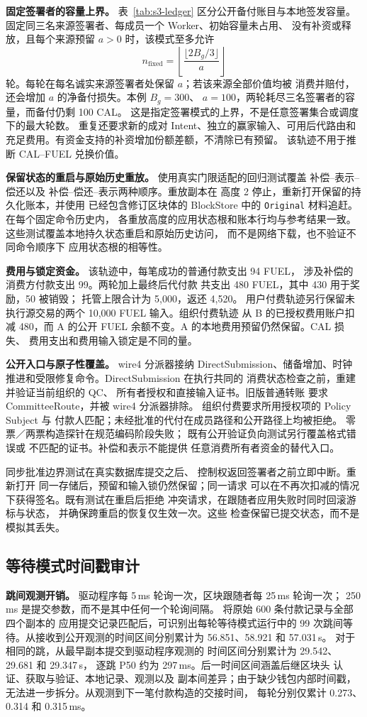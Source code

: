 \noindent\textbf{固定签署者的容量上界。}
表~\ref{tab:s3-ledger} 区分公开备付账目与本地签发容量。
固定同三名来源签署者、每成员一个 Worker、初始容量未占用、
没有补资或释放，且每个来源预留 $a>0$ 时，该模式至多允许
\[
  n_{\mathrm{fixed}}=\left\lfloor
       \frac{\lfloor2B_g/3\rfloor}{a}\right\rfloor
\]
轮。每轮在每名诚实来源签署者处保留 $a$；若该来源全部价值均被
消费并赔付，还会增加 $a$ 的净备付损失。本例 $B_g=300$、
$a=100$，两轮耗尽三名签署者的容量，而备付仍剩 100 CAL。
这是指定签署模式的上界，不是任意签署集合或调度下的最大轮数。
重复还要求新的成对 Intent、独立的赢家输入、可用后代路由和
充足费用。有资金支持的补资增加份额差额，不清除已有预留。
该轨迹不用于推断 CAL--FUEL 兑换价值。

\noindent\textbf{保留状态的重启与原始历史重放。}
使用真实门限适配的回归测试覆盖
补偿--表示--偿还以及
补偿--偿还--表示两种顺序。重放副本在
高度 2 停止，重新打开保留的持久化账本，并使用
已经包含修订区块体的 BlockStore 中的
\texttt{Original} 材料追赶。在每个固定命令历史内，
各重放高度的应用状态根和账本行均与参考结果一致。
这些测试覆盖本地持久状态重启和原始历史访问，
而不是网络下载，也不验证不同命令顺序下
应用状态根的相等性。

\noindent\textbf{费用与锁定资金。}
该轨迹中，每笔成功的普通付款支出 94 FUEL，
涉及补偿的消费方付款支出 99。两轮加上最终后代付款
共支出 480 FUEL，其中 430 用于奖励，50 被销毁；
托管上限合计为 5,000，返还 4,520。
用户付费轨迹另行保留未执行源交易的两个
10,000 FUEL 输入。组织付费轨迹
从 B 的已授权费用账户扣减 480，而 A 的公开 FUEL
余额不变。A 的本地费用预留仍然保留。CAL 损失、
费用支出和费用输入锁定是不同的量。

\noindent\textbf{公开入口与原子性覆盖。}
wire4 分派器接纳 DirectSubmission、储备增加、时钟
推进和受限修复命令。DirectSubmission 在执行共同的
消费状态检查之前，重建并验证当前组织的 QC、
所有者授权和直接输入证书。旧版普通转账
要求 CommitteeRoute，并被 wire4 分派器排除。
组织付费要求所用授权项的 Policy Subject 与
付款人匹配；未经批准的代付在成员路径和公开路径上均被拒绝。
零票／两票构造探针在规范编码阶段失败；
既有公开验证负向测试另行覆盖格式错误或
不匹配的证书。补偿和表示不能提供
任意消费所有者资金的替代入口。

同步批准边界测试在真实数据库提交之后、
控制权返回签署者之前立即中断。重新打开
同一存储后，预留和输入锁仍然保留；同一请求
可以在不再次扣减的情况下获得签名。既有测试在重启后拒绝
冲突请求，在跟随者应用失败时同时回滚游标与状态，
并确保跨重启的恢复仅生效一次。这些
检查保留已提交状态，而不是模拟其丢失。

\subsection{等待模式时间戳审计}
\noindent\textbf{跳间观测开销。}
驱动程序每 5\,ms 轮询一次，区块跟随者每 25\,ms 轮询一次；
250\,ms 是提交参数，而不是其中任何一个轮询间隔。
将原始 600 条付款记录与全部四个副本的
应用提交记录匹配后，可识别出每轮等待模式运行中的
99 次跳间等待。从接收到公开观测的时间区间分别累计为
56.851、58.921 和 57.031\,s。
对于相同的跳，从最早副本提交到驱动程序观测的
时间区间分别累计为 29.542、29.681 和 29.347\,s，
逐跳 P50 约为 297\,ms。后一时间区间涵盖后继区块头
认证、获取与验证、本地记录、观测以及
副本间差异；由于缺少钱包内部时间戳，
无法进一步拆分。从观测到下一笔付款构造的交接时间，
每轮分别仅累计 0.273、0.314 和 0.315\,ms。

